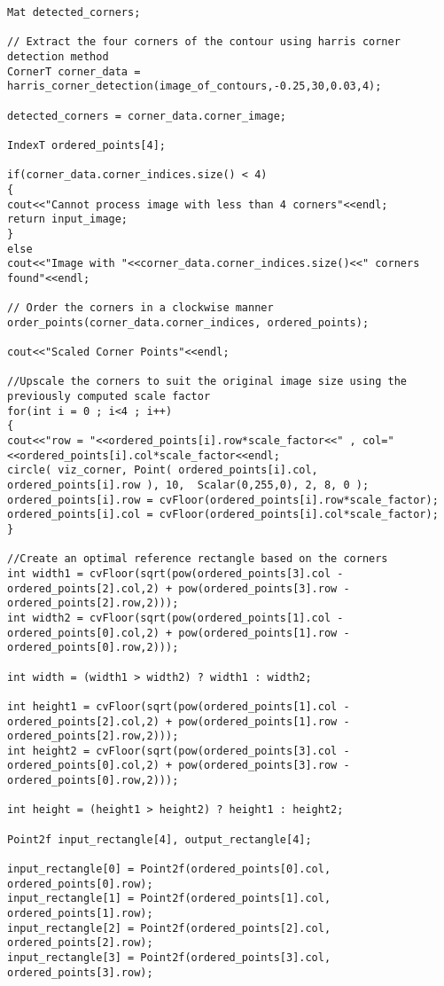 \begin{lstlisting}
Mat detected_corners;

// Extract the four corners of the contour using harris corner detection method
CornerT corner_data = harris_corner_detection(image_of_contours,-0.25,30,0.03,4);

detected_corners = corner_data.corner_image;

IndexT ordered_points[4];

if(corner_data.corner_indices.size() < 4)
{
cout<<"Cannot process image with less than 4 corners"<<endl;
return input_image;
}
else
cout<<"Image with "<<corner_data.corner_indices.size()<<" corners found"<<endl;

// Order the corners in a clockwise manner
order_points(corner_data.corner_indices, ordered_points);

cout<<"Scaled Corner Points"<<endl;

//Upscale the corners to suit the original image size using the previously computed scale factor
for(int i = 0 ; i<4 ; i++)
{
cout<<"row = "<<ordered_points[i].row*scale_factor<<" , col="<<ordered_points[i].col*scale_factor<<endl;
circle( viz_corner, Point( ordered_points[i].col, ordered_points[i].row ), 10,  Scalar(0,255,0), 2, 8, 0 );
ordered_points[i].row = cvFloor(ordered_points[i].row*scale_factor);
ordered_points[i].col = cvFloor(ordered_points[i].col*scale_factor);
}	

//Create an optimal reference rectangle based on the corners
int width1 = cvFloor(sqrt(pow(ordered_points[3].col - ordered_points[2].col,2) + pow(ordered_points[3].row - ordered_points[2].row,2)));
int width2 = cvFloor(sqrt(pow(ordered_points[1].col - ordered_points[0].col,2) + pow(ordered_points[1].row - ordered_points[0].row,2)));

int width = (width1 > width2) ? width1 : width2;

int height1 = cvFloor(sqrt(pow(ordered_points[1].col - ordered_points[2].col,2) + pow(ordered_points[1].row - ordered_points[2].row,2)));
int height2 = cvFloor(sqrt(pow(ordered_points[3].col - ordered_points[0].col,2) + pow(ordered_points[3].row - ordered_points[0].row,2)));

int height = (height1 > height2) ? height1 : height2;

Point2f input_rectangle[4], output_rectangle[4];

input_rectangle[0] = Point2f(ordered_points[0].col, ordered_points[0].row);
input_rectangle[1] = Point2f(ordered_points[1].col, ordered_points[1].row);
input_rectangle[2] = Point2f(ordered_points[2].col, ordered_points[2].row);
input_rectangle[3] = Point2f(ordered_points[3].col, ordered_points[3].row);


\end{lstlisting}
